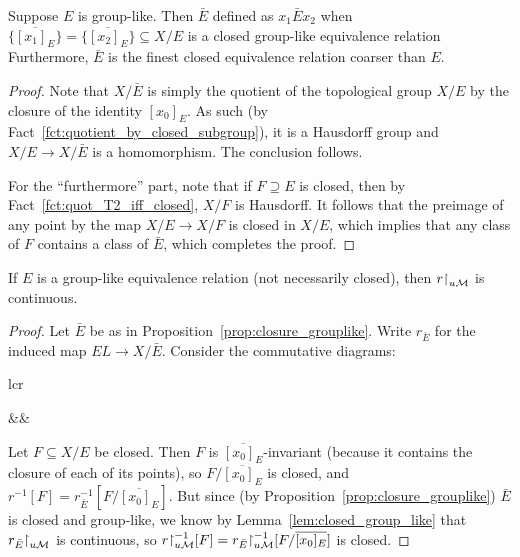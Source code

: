 	
	\begin{prop}
		\label{prop:closure_grouplike}
		Suppose $E$ is group-like. Then $\bar E$ defined as $x_1\mathrel{\bar E} x_2$ when $\overline{\{[x_1]_E\}}=\overline{\{[x_2]_E\}}\subseteq X/E$ is a closed group-like equivalence relation Furthermore, $\bar E$ is the finest closed equivalence relation coarser than $E$.
	\end{prop}
	\begin{proof}
		Note that $X/{\bar E}$ is simply the quotient of the topological group $X/E$ by the closure of the identity $[x_0]_E$. As such (by Fact~\ref{fct:quotient_by_closed_subgroup}), it is a Hausdorff group and $X/E\to X/{\bar E}$ is a homomorphism. The conclusion follows.
		
		For the ``furthermore'' part, note that if $F\supseteq E$ is closed, then by Fact~\ref{fct:quot_T2_iff_closed}, $X/F$ is Hausdorff. It follows that the preimage of any point by the map $X/E\to X/F$ is closed in $X/E$, which implies that any class of $F$ contains a class of $\bar E$, which completes the proof.
	\end{proof}
	
	\begin{cor}
		\label{cor:r_uM_cont}
		If $E$ is a group-like equivalence relation (not necessarily closed), then $r\mathord{\upharpoonright}_{u{\mathcal M}}$ is continuous.
	\end{cor}
	\begin{proof}
		Let $\bar E$ be as in Proposition~\ref{prop:closure_grouplike}. Write $r_{\bar E}$ for the induced map $EL\to X/{\bar E}$. Consider the commutative diagrams:
		\begin{center}
			\begin{tabular}{lcr}
				\begin{tikzcd}
				u\cM\arrow[d,"r\restr_{u\cM}"]\arrow[dr,"r_{\bar E}\restr_{u\cM}"] & \\
				X/E\arrow[r] & X/{\bar E}
				\end{tikzcd}
				&&
			\end{tabular}
		\end{center}
		Let $F\subseteq X/E$ be closed. Then $F$ is $\overline{[x_0]_E}$-invariant (because it contains the closure of each of its points), so $F/\overline{[x_0]_E}$ is closed, and $r^{-1}[F]=r_{\bar E}^{-1}[F/\overline{[x_0]_E}]$. But since (by Proposition~\ref{prop:closure_grouplike}) $\bar E$ is closed and group-like, we know by Lemma~\ref{lem:closed_group_like} that $r_{\bar E}\mathord{\upharpoonright}_{u{\mathcal M}}$ is continuous, so $r\mathord{\upharpoonright}_{u{\mathcal M}}^{-1}[F]=r_{\bar E}\mathord{\upharpoonright}_{u{\mathcal M}}^{-1}[F/\overline{[x_0]_E}]$ is closed.
	\end{proof}
	

